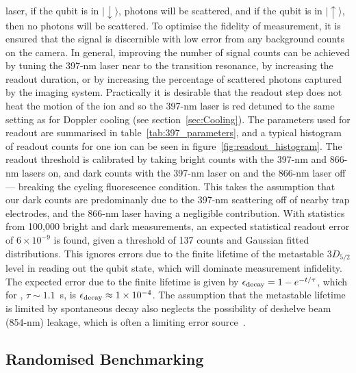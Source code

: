     laser, if the qubit is in $|\downarrow\rangle$, photons will be scattered, and if the qubit is in
    $|\uparrow\rangle$, then no photons will be scattered. To optimise the fidelity of
    measurement, it is ensured that the signal is discernible with low error from any
    background counts on the camera. In general, improving the number of signal
    counts can be achieved by tuning the 397-nm laser near to the transition
    resonance, by increasing the readout duration, or by increasing the
    percentage of scattered photons captured by the imaging system. Practically
    it is desirable that the readout step does not heat the motion of the ion and so
    the 397-nm laser is red detuned to the same setting as for Doppler cooling
    (see section~\ref{sec:Cooling}). The parameters used for readout are
    summarised in table~\ref{tab:397_parameters}, and a typical histogram of
    readout counts for one ion can be seen in
    figure~\ref{fig:readout_histogram}. The readout threshold is calibrated by taking bright counts with the 397-nm and 866-nm lasers on, and dark counts with the 397-nm laser on and the 866-nm laser off --- breaking the cycling fluorescence condition. This takes the assumption that our dark counts are predominanly due to the 397-nm scattering off of nearby trap electrodes, and the 866-nm laser having a negligible contribution. 
    With statistics from 100,000 bright and dark measurements, an expected
    statistical readout error of $6\times10^{-9}$ is found, given a threshold of
    137 counts and Gaussian fitted distributions. This ignores errors due to the
    finite lifetime of the metastable $3D_{5/2}$ level in reading out the qubit
    state, which will dominate measurement infidelity. The expected error due
    to the finite lifetime is given by $\epsilon_{\rm decay} = 1 - e^{-t/\tau}$,
    which for \ca, $\tau \sim 1.1$~s, is $\epsilon_{\rm decay} \approx 1\times
    10^{-4}$. The assumption that the metastable lifetime is limited by
    spontaneous decay also neglects the possibility of deshelve beam (854-nm)
    leakage, which is often a limiting error source~\cite{Abaqus SPAM}. \\
    
\subsection{Randomised Benchmarking}
\label{sec:Randomised Benchmarking}

